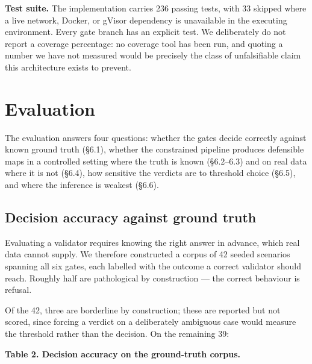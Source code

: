 \textbf{Test suite.} The implementation carries 236 passing tests, with 33 skipped where a live network, Docker, or gVisor dependency is unavailable in the executing environment. Every gate branch has an explicit test. We deliberately do not report a coverage percentage: no coverage tool has been run, and quoting a number we have not measured would be precisely the class of unfalsifiable claim this architecture exists to prevent.

\section{Evaluation}
The evaluation answers four questions: whether the gates decide correctly against known ground truth (\S{}6.1), whether the constrained pipeline produces defensible maps in a controlled setting where the truth is known (\S{}6.2--6.3) and on real data where it is not (\S{}6.4), how sensitive the verdicts are to threshold choice (\S{}6.5), and where the inference is weakest (\S{}6.6).

\subsection{Decision accuracy against ground truth}
Evaluating a validator requires knowing the right answer in advance, which real data cannot supply. We therefore constructed a corpus of 42 seeded scenarios spanning all six gates, each labelled with the outcome a correct validator should reach. Roughly half are pathological by construction --- the correct behaviour is refusal.

Of the 42, three are borderline by construction; these are reported but not scored, since forcing a verdict on a deliberately ambiguous case would measure the threshold rather than the decision. On the remaining 39:

\textbf{Table 2. Decision accuracy on the ground-truth corpus.}

